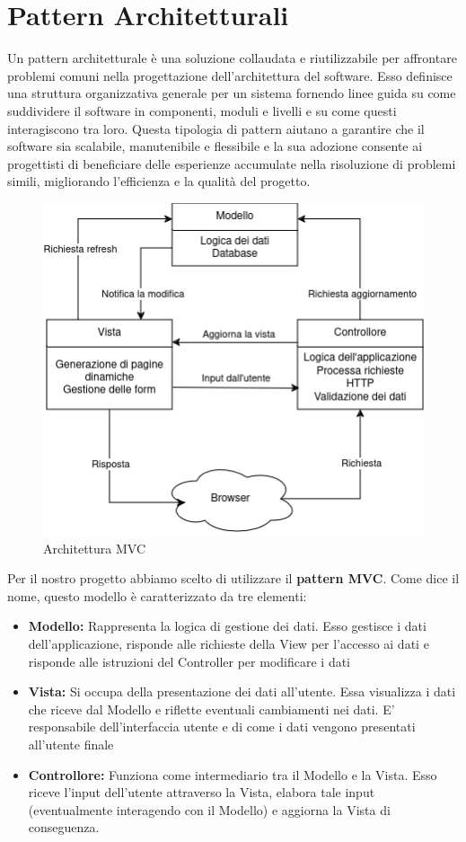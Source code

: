 \documentclass[a4paper, 11pt,oneside]{book}
\newcommand{\spacing}{\par\bigskip\noindent}
\begin{document}
\chapter{Pattern Architetturali}
    Un pattern architetturale è una soluzione collaudata e riutilizzabile per affrontare problemi comuni nella progettazione dell'architettura del software. Esso definisce una struttura organizzativa generale per un sistema fornendo linee guida su come suddividere il software in componenti, moduli e livelli e su come questi interagiscono tra loro.
    Questa tipologia di pattern aiutano a garantire che il software sia scalabile, manutenibile e flessibile e la sua adozione consente ai progettisti di beneficiare delle esperienze accumulate nella risoluzione di problemi simili, migliorando l'efficienza e la qualità del progetto.
    \begin{figure}[H]
        \centering
        \includegraphics[scale=0.75]{Architettura MVC.png}
        \caption{Architettura MVC}
        \label{fig:architettura_mvc}
    \end{figure}
    \spacing
    Per il nostro progetto abbiamo scelto di utilizzare il \textbf{pattern MVC}. Come dice il nome, questo modello è caratterizzato da tre elementi:
    \begin{itemize}
        \item \textbf{Modello:} Rappresenta la logica di gestione dei dati. Esso gestisce i dati dell'applicazione, risponde alle richieste della View per l'accesso ai dati e risponde alle istruzioni del Controller per modificare i dati
        \item \textbf{Vista:} Si occupa della presentazione dei dati all'utente. Essa visualizza i dati che riceve dal Modello e riflette eventuali cambiamenti nei dati. E' responsabile dell'interfaccia utente e di come i dati vengono presentati all'utente finale
        \item \textbf{Controllore:} Funziona come intermediario tra il Modello e la Vista. Esso riceve l'input dell'utente attraverso la Vista, elabora tale input (eventualmente interagendo con il Modello) e aggiorna la Vista di conseguenza.
    \end{itemize}
\end{document}
